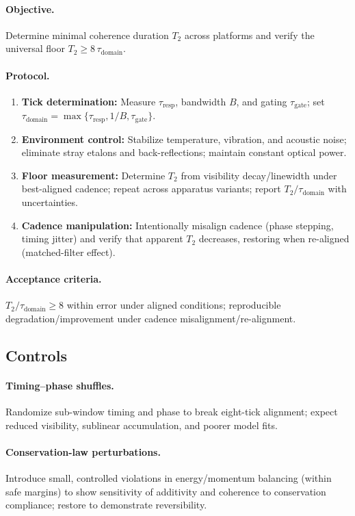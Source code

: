 \documentclass[12pt,a4paper]{article}
\begin{document}
\paragraph{Objective.}
Determine minimal coherence duration $T_{2}$ across platforms and verify the universal floor $T_{2}\ge 8\,\tau_{\mathrm{domain}}$.

\paragraph{Protocol.}
\begin{enumerate}
  \item \textbf{Tick determination:} Measure $\tau_{\mathrm{resp}}$, bandwidth $B$, and gating $\tau_{\mathrm{gate}}$; set $\tau_{\mathrm{domain}}=\max\{\tau_{\mathrm{resp}}, 1/B, \tau_{\mathrm{gate}}\}$.
  \item \textbf{Environment control:} Stabilize temperature, vibration, and acoustic noise; eliminate stray etalons and back-reflections; maintain constant optical power.
  \item \textbf{Floor measurement:} Determine $T_{2}$ from visibility decay/linewidth under best-aligned cadence; repeat across apparatus variants; report $T_{2}/\tau_{\mathrm{domain}}$ with uncertainties.
  \item \textbf{Cadence manipulation:} Intentionally misalign cadence (phase stepping, timing jitter) and verify that apparent $T_{2}$ decreases, restoring when re-aligned (matched-filter effect).
\end{enumerate}

\paragraph{Acceptance criteria.}
$T_{2}/\tau_{\mathrm{domain}}\ge 8$ within error under aligned conditions; reproducible degradation/improvement under cadence misalignment/re-alignment.

\subsection{Controls}
\paragraph{Timing–phase shuffles.}
Randomize sub-window timing and phase to break eight-tick alignment; expect reduced visibility, sublinear accumulation, and poorer model fits.

\paragraph{Conservation-law perturbations.}
Introduce small, controlled violations in energy/momentum balancing (within safe margins) to show sensitivity of additivity and coherence to conservation compliance; restore to demonstrate reversibility.
\end{document}

